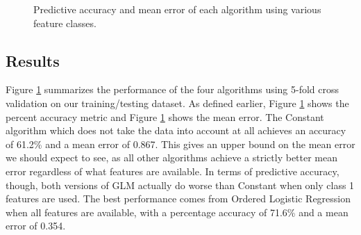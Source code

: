 \begin{figure}[t]
\centering
{}
\caption{Predictive accuracy and mean error of each algorithm using various feature classes.}
\label{linear_results}
\end{figure}

\subsection{Results}

Figure \ref{linear_results} summarizes the performance of the four algorithms using 5-fold cross validation on our training/testing dataset.  As defined earlier, Figure \ref{linear_results}  shows the percent accuracy metric and Figure \ref{linear_results}  shows the mean error.  The Constant algorithm which does not take the data into account at all achieves an accuracy of 61.2\% and a mean error of 0.867.  This gives an upper bound on the mean error we should expect to see, as all other algorithms achieve a strictly better mean error regardless of what features are available.  In terms of predictive accuracy, though, both versions of GLM actually do worse than Constant when only class 1 features are used.  The best performance comes from Ordered Logistic Regression when all features are available, with a percentage accuracy of 71.6\% and a mean error of 0.354.

